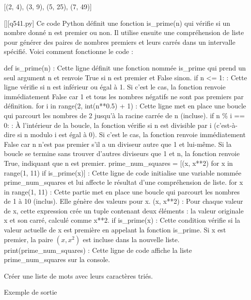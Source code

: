 [(2, 4), (3, 9), (5, 25), (7, 49)]
        \par
        \begin{solution}
            \renewcommand{\nomfichier}{q541.py}
            \pythonfile{\chemincode \nomfichier}[][\nomfichier]
            Ce code Python définit une fonction is\_prime(n) qui vérifie si un nombre donné n est premier ou non. Il utilise ensuite une compréhension de liste pour générer des paires de nombres premiers et leurs carrés dans un intervalle spécifié. Voici comment fonctionne le code :

    def is\_prime(n) : Cette ligne définit une fonction nommée is\_prime qui prend un seul argument n et renvoie True si n est premier et False sinon.
        if n <= 1: : Cette ligne vérifie si n est inférieur ou égal à 1. Si c'est le cas, la fonction renvoie immédiatement False car 1 et tous les nombres négatifs ne sont pas premiers par définition.
        for i in range(2, int(n**0.5) + 1) : Cette ligne met en place une boucle qui parcourt les nombres de 2 jusqu'à la racine carrée de n (incluse).
        if n \% i == 0: : À l'intérieur de la boucle, la fonction vérifie si n est divisible par i (c'est-à-dire si n modulo i est égal à 0). Si c'est le cas, la fonction renvoie immédiatement False car n n'est pas premier s'il a un diviseur autre que 1 et lui-même.
        Si la boucle se termine sans trouver d'autres diviseurs que 1 et n, la fonction renvoie True, indiquant que n est premier.
    prime\_num\_squares = [(x, x**2) for x in range(1, 11) if is\_prime(x)] : Cette ligne de code initialise une variable nommée prime\_num\_squares et lui affecte le résultat d'une compréhension de liste.
        for x in range(1, 11) : Cette partie met en place une boucle qui parcourt les nombres de 1 à 10 (inclus). Elle génère des valeurs pour x.
        (x, x**2) : Pour chaque valeur de x, cette expression crée un tuple contenant deux éléments : la valeur originale x et son carré, calculé comme x**2.
        if is\_prime(x) : Cette condition vérifie si la valeur actuelle de x est première en appelant la fonction is\_prime. Si x est premier, la paire $(x, x^2)$ est incluse dans la nouvelle liste.
    print(prime\_num\_squares) : Cette ligne de code affiche la liste prime\_num\_squares sur la console.
        \end{solution}
        

        \question
        Créer une liste de mots avec leurs caractères triés.

Exemple de sortie

